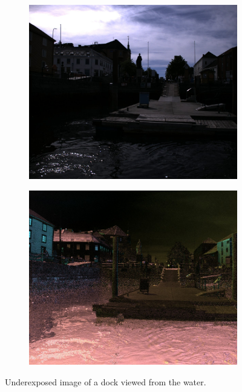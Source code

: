 \begin{figure}[H]
    \begin{subfigure}[T]{.49\textwidth}
        \includegraphics[width=\textwidth]{figures/pictures/img_10170_s0.jpg}
    \end{subfigure} \hfill
    \begin{subfigure}[T]{.49\textwidth}
        \includegraphics[width=\textwidth]{figures/pictures/img_10170_pol.jpg}
    \end{subfigure}
    \caption{Underexposed image of a dock viewed from the water.}
\end{figure}
\vspace{-.5cm}


